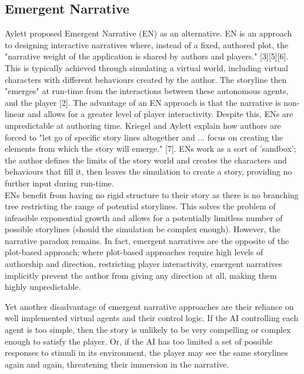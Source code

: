 \documentclass{article}
\begin{document}
\subsection{Emergent Narrative}

Aylett proposed Emergent Narrative (EN) as an alternative. EN is an approach to designing interactive narratives where, instead of a fixed, authored plot, the "narrative weight of the application is shared by authors and players." [3][5][6]. This is typically achieved through simulating a virtual world, including virtual characters with different behaviours created by the author. The storyline then "emerges" at run-time from the interactions between these autonomous agents, and the player [2]. The advantage of an EN approach is that the narrative is non-linear and allows for a greater level of player interactivity. Despite this, ENs are unpredictable at authoring time. Kriegel and Aylett explain how authors are forced to "let go of specific story lines altogether and ... focus on creating the elements from which the story will emerge." [7]. ENs work as a sort of 'sandbox'; the author defines the limits of the story world and creates the characters and behaviours that fill it, then leaves the simulation to create a story, providing no further input during run-time.\\

\noindent ENs benefit from having no rigid structure to their story as there is no branching tree restricting the range of potential storylines. This solves the problem of infeasible exponential growth and allows for a potentially limitless number of possible storylines (should the simulation be complex enough). However, the narrative paradox remains. In fact, emergent narratives are the opposite of the plot-based approach; where plot-based approaches require high levels of authorship and direction, restricting player interactivity, emergent narratives implicitly prevent the author from giving any direction at all, making them highly unpredictable.

Yet another disadvantage of emergent narrative approaches are their reliance on well implemented virtual agents and their control logic. If the AI controlling each agent is too simple, then the story is unlikely to be very compelling or complex enough to satisfy the player. Or, if the AI has too limited a set of possible responses to stimuli in its environment, the player may see the same storylines again and again, threatening their immersion in the narrative.
\end{document}
